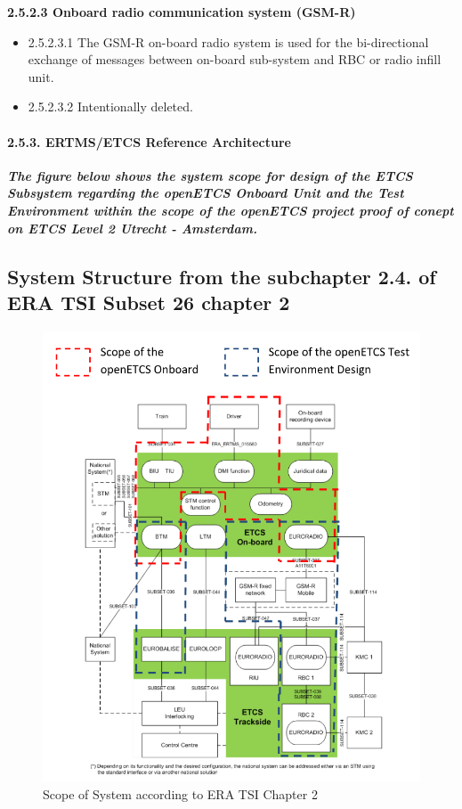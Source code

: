 \textbf{2.5.2.3	Onboard radio communication system (GSM-R)}
\begin{itemize}
\item 2.5.2.3.1	The GSM-R on-board radio system is used for the bi-directional exchange of messages between on-board sub-system and RBC or radio infill unit. 
\item 2.5.2.3.2	Intentionally deleted.
\end{itemize}

\paragraph{2.5.3. ERTMS/ETCS Reference Architecture}
\textit{\textbf{The figure below shows the system scope for design of the ETCS Subsystem regarding the openETCS Onboard Unit and the Test Environment within the scope of the openETCS project proof of conept on ETCS Level 2 Utrecht - Amsterdam.}}

\subsection{System Structure from the subchapter 2.4. of ERA TSI Subset 26 chapter 2}
\begin{figure}[h]
\includegraphics[scale=0.7]{images/SRSArchitecture}
\caption{Scope of System according to ERA TSI Chapter 2}
\label{Scope of System according to ERA TSI Chapter 2}
\end{figure}


